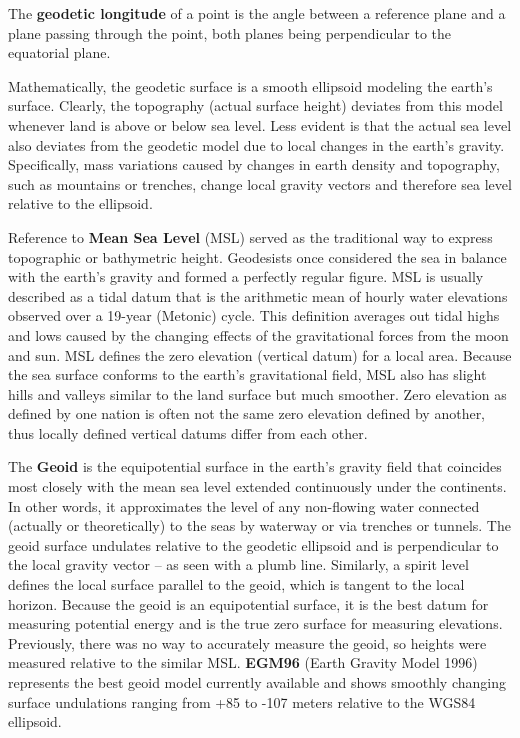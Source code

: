 \documentclass[
]{book}
\begin{document}
The \textbf{geodetic longitude} of a point is the angle between a reference plane and a plane passing through the point, both planes being perpendicular to the equatorial plane.

Mathematically, the geodetic surface is a smooth ellipsoid modeling the earth's surface. Clearly, the topography (actual surface height) deviates from this model whenever land is above or below sea level. Less evident is that the actual sea level also deviates from the geodetic model due to local changes in the earth's gravity. Specifically, mass variations caused by changes in earth density and topography, such as mountains or trenches, change local gravity vectors and therefore sea level relative to the ellipsoid.

Reference to \textbf{Mean Sea Level} (MSL) served as the traditional way to express topographic or bathymetric height. Geodesists once considered the sea in balance with the earth's gravity and formed a perfectly regular figure. MSL is usually described as a tidal datum that is the arithmetic mean of hourly water elevations observed over a 19-year (Metonic) cycle. This definition averages out tidal highs and lows caused by the changing effects of the gravitational forces from the moon and sun. MSL defines the zero elevation (vertical datum) for a local area. Because the sea surface conforms to the earth's gravitational field, MSL also has slight hills and valleys similar to the land surface but much smoother. Zero elevation as defined by one nation is often not the same zero elevation defined by another, thus locally defined vertical datums differ from each other.

The \textbf{Geoid} is the equipotential surface in the earth's gravity field that coincides most closely with the mean sea level extended continuously under the continents. In other words, it approximates the level of any non-flowing water connected (actually or theoretically) to the seas by waterway or via trenches or tunnels. The geoid surface undulates relative to the geodetic ellipsoid and is perpendicular to the local gravity vector -- as seen with a plumb line. Similarly, a spirit level defines the local surface parallel to the geoid, which is tangent to the local horizon. Because the geoid is an equipotential surface, it is the best datum for measuring potential energy and is the true zero surface for measuring elevations. Previously, there was no way to accurately measure the geoid, so heights were measured relative to the similar MSL. \textbf{EGM96} (Earth Gravity Model 1996) represents the best geoid model currently available and shows smoothly changing surface undulations ranging from +85 to -107 meters relative to the WGS84 ellipsoid.
\end{document}

